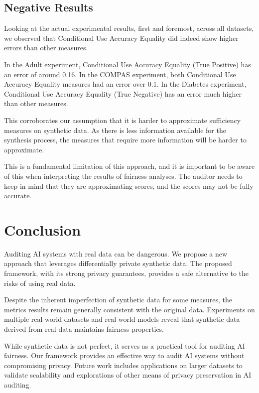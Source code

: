 \documentclass[manuscript,screen,review,anonymous]{acmart}
\begin{document}
\subsection{Negative Results}

Looking at the actual experimental results, first and foremost, across all datasets, we observed that Conditional Use Accuracy Equality did indeed show higher errors than other measures.

In the Adult experiment, Conditional Use Accuracy Equality (True Positive) has an error of around 0.16. In the COMPAS experiment, both Conditional Use Accuracy Equality measures had an error over 0.1. In the Diabetes experiment, Conditional Use Accuracy Equality (True Negative) has an error much higher than other measures.

This corroborates our assumption that it is harder to approximate sufficiency measures on synthetic data. As there is less information available for the synthesis process, the measures that require more information will be harder to approximate.


This is a fundamental limitation of this approach, and it is important to be aware of this when interpreting the results of fairness analyses. The auditor needs to keep in mind that they are approximating scores, and the scores may not be fully accurate.

\section{Conclusion}

Auditing AI systems with real data can be dangerous. We propose a new approach that leverages differentially private synthetic data. The proposed framework, with its strong privacy guarantees, provides a safe alternative to the risks of using real data.

Despite the inherent imperfection of synthetic data for some measures, the metrics results remain generally consistent with the original data. Experiments on multiple real-world datasets and real-world models reveal that synthetic data derived from real data maintains fairness properties.

While synthetic data is not perfect, it serves as a practical tool for auditing AI fairness. Our framework provides an effective way to audit AI systems without compromising privacy. Future work includes applications on larger datasets to validate scalability and explorations of other means of privacy preservation in AI auditing.
\end{document}
